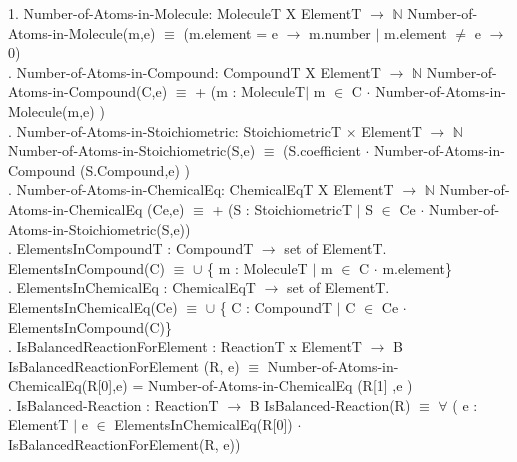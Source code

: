 \documentclass[12pt, titlepage]{article}
\begin{document}
1. Number-of-Atoms-in-Molecule: MoleculeT  X ElementT $\rightarrow$ $\mathbb{N}$
\newline
Number-of-Atoms-in-Molecule(m,e) $\equiv$ (m.element = e $\rightarrow$ m.number $\vert$ m.element $\neq$ e $\rightarrow$ 0) \\
. Number-of-Atoms-in-Compound: CompoundT  X ElementT $\rightarrow$ $\mathbb{N}$
\newline
Number-of-Atoms-in-Compound(C,e) $\equiv$ + (m : MoleculeT$\vert$ m $\in$ C $\cdot$   Number-of-Atoms-in-Molecule(m,e) ) \\
. Number-of-Atoms-in-Stoichiometric: StoichiometricT  $\times$ ElementT $\rightarrow$ $\mathbb{N}$
\newline
Number-of-Atoms-in-Stoichiometric(S,e) $\equiv$ (S.coefficient $\cdot$ Number-of-Atoms-in-Compound (S.Compound,e) )  \\
. Number-of-Atoms-in-ChemicalEq: ChemicalEqT  X ElementT $\rightarrow$ $\mathbb{N}$
\newline
Number-of-Atoms-in-ChemicalEq (Ce,e) $\equiv$ + (S : StoichiometricT $\vert$ S $\in$ Ce $\cdot$ Number-of-Atoms-in-Stoichiometric(S,e))\\
. ElementsInCompoundT : CompoundT $\rightarrow$ set of ElementT.
\newline
ElementsInCompound(C) $\equiv$ $\cup$ \{ m : MoleculeT $\vert$ m $\in$ C $\cdot$ m.element\}\\
. ElementsInChemicalEq : ChemicalEqT $\rightarrow$ set of ElementT.
\newline
ElementsInChemicalEq(Ce) $\equiv$ $\cup$ \{ C : CompoundT $\vert$ C $\in$ Ce $\cdot$ ElementsInCompound(C)\}\\
. IsBalancedReactionForElement : ReactionT x ElementT $\rightarrow$ B 
\newline
IsBalancedReactionForElement (R, e) $\equiv$ Number-of-Atoms-in-ChemicalEq(R[0],e) = Number-of-Atoms-in-ChemicalEq (R[1] ,e )\\ 
. IsBalanced-Reaction : ReactionT  $\rightarrow$ B 
\newline
IsBalanced-Reaction(R) $\equiv$ $\forall$ ( e :  ElementT $\vert$ e $\in$ ElementsInChemicalEq(R[0]) $\cdot$ IsBalancedReactionForElement(R, e))
\end{document}
